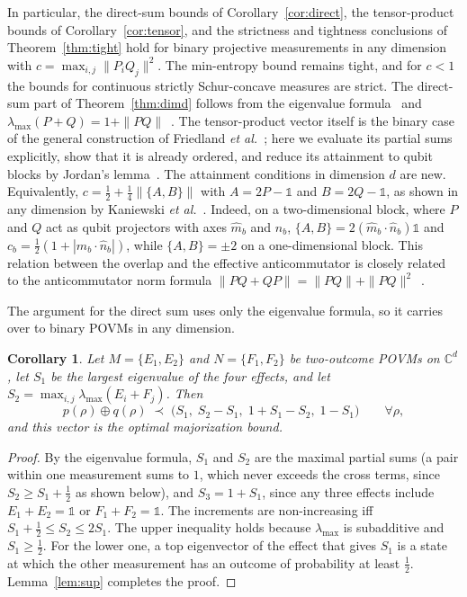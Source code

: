 \documentclass[aps,pra,twocolumn,superscriptaddress,nofootinbib,floatfix]{revtex4-2}
\newtheorem{corollary}{Corollary}
\theoremstyle{definition}
\newcommand{\mhat}{\hat m}
\newcommand{\nhat}{\hat n}
\newcommand{\maj}{\prec}
\begin{document}
In particular, the direct-sum bounds of Corollary~\ref{cor:direct}, the
tensor-product bounds of Corollary~\ref{cor:tensor}, and the strictness and
tightness conclusions of Theorem~\ref{thm:tight} hold for binary projective
measurements in any dimension with $c=\max_{i,j}\|P_iQ_j\|^2$. The min-entropy
bound remains tight, and for $c<1$ the bounds for continuous strictly
Schur-concave measures are strict.
The direct-sum part of Theorem~\ref{thm:dimd} follows from the eigenvalue
formula~\cite{Baek2019} and $\lambda_{\max}(P+Q)=1+\|PQ\|$~\cite{Halmos1969}.
The tensor-product vector itself is the binary case of the general construction
of Friedland \emph{et al.}~\cite{FGG2013}; here we evaluate its partial sums
explicitly, show that it is already ordered, and reduce its attainment to qubit
blocks by Jordan's lemma~\cite{Halmos1969,KTW2014}. The attainment conditions
in dimension $d$ are new.
Equivalently, $c=\frac12+\frac14\|\{A,B\}\|$ with $A=2P-\mathds{1}$ and
$B=2Q-\mathds{1}$, as shown in any dimension by Kaniewski
\emph{et al.}~\cite{KTW2014}. Indeed, on a two-dimensional block, where $P$ and $Q$ act as
qubit projectors with axes $\mhat_b$ and $\nhat_b$,
$\{A,B\}=2(\mhat_b\cdot\nhat_b)\mathds{1}$ and
$c_b=\frac12(1+|\mhat_b\cdot\nhat_b|)$, while $\{A,B\}=\pm2$ on a
one-dimensional block. This relation between the overlap and the effective
anticommutator is closely related to the anticommutator norm formula
$\|PQ+QP\|=\|PQ\|+\|PQ\|^2$~\cite{Walters2016}.

The argument for the direct sum uses only the eigenvalue formula, so it carries
over to binary POVMs in any dimension.

\begin{corollary}
\label{cor:binary-povm}
Let $M=\{E_1,E_2\}$ and $N=\{F_1,F_2\}$ be two-outcome POVMs on $\mathbb{C}^d$, let
$S_1$ be the largest eigenvalue of the four effects, and let
$S_2=\max_{i,j}\lambda_{\max}(E_i+F_j)$. Then
\begin{equation}
  p(\rho)\oplus q(\rho)\;\maj\;\bigl(S_1,\;S_2-S_1,\;1+S_1-S_2,\;1-S_1\bigr)
  \qquad\forall\rho,
  \label{eq:om-binary}
\end{equation}
and this vector is the optimal majorization bound.
\end{corollary}

\begin{proof}
By the eigenvalue formula, $S_1$ and $S_2$ are the maximal partial sums (a pair
within one measurement sums to $1$, which never exceeds the cross terms, since
$S_2\ge S_1+\frac12$ as shown below), and $S_3=1+S_1$, since any three effects include $E_1+E_2=\mathds{1}$ or
$F_1+F_2=\mathds{1}$. The increments are non-increasing iff
$S_1+\frac12\le S_2\le2S_1$. The upper inequality holds because $\lambda_{\max}$ is
subadditive and $S_1\ge\frac12$. For the lower one, a top eigenvector of the
effect that gives $S_1$ is a state at which the other measurement has an
outcome of probability at least $\frac12$. Lemma~\ref{lem:sup} completes the
proof.
\end{proof}
\end{document}
